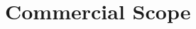 \documentclass[../thesis.tex]{subfiles}
\begin{document}
\chapter{Commercial Scope}



\end{document}
